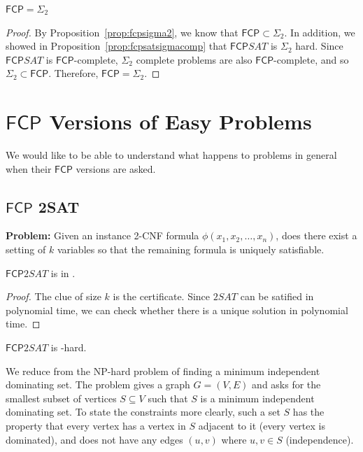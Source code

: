 \documentclass[runningheads,a4paper]{llncs}
\begin{document}
\begin{theorem}
$\mathsf{FCP} = \Sigma_2$
\end{theorem}

\begin{proof}
By Proposition~\ref{prop:fcpsigma2}, we know that $\mathsf{FCP} \subset \Sigma_2$. In addition, we showed in Proposition~\ref{prop:fcpsatsigmacomp} that $\mathsf{FCP} SAT$ is $\Sigma_2$ hard. Since $\mathsf{FCP} SAT$ is $\mathsf{FCP}$-complete, $\Sigma_2$ complete problems are also $\mathsf{FCP}$-complete, and so $\Sigma_2 \subset \mathsf{FCP}$. Therefore, $\mathsf{FCP} = \Sigma_2$. 
\end{proof}

\section{$\mathsf{FCP}$ Versions of Easy Problems}

We would like to be able to understand what happens to problems in general when their $\mathsf{FCP}$ versions are asked. 

\subsection{$\mathsf{FCP}$ 2SAT} 

\textbf{Problem:} Given an instance 2-CNF formula $\phi(x_1,x_2,\dots,x_n)$, does there exist a setting of $k$ variables so that the remaining formula is uniquely satisfiable.

\begin{proposition}
$\mathsf{FCP} 2SAT$ is in \NP.
\end{proposition}

\begin{proof}
The clue of size $k$ is the certificate. Since $2SAT$ can be satified in polynomial time, we can check whether there is a unique solution in polynomial time.
\end{proof}

\begin{theorem} 
$\mathsf{FCP} 2SAT$ is \NP-hard.
\end{theorem}

We reduce from the NP-hard problem of finding a minimum independent dominating set. The problem gives a graph $G = (V,E)$ and asks for the smallest subset of vertices $S \subseteq V$ such that $S$ is a minimum independent dominating set. To state the constraints more clearly, such a set $S$ has the property that every vertex has a vertex in $S$ adjacent to it (every vertex is dominated), and does not have any edges $(u,v)$ where $u,v \in S$ (independence). \\
\end{document}
